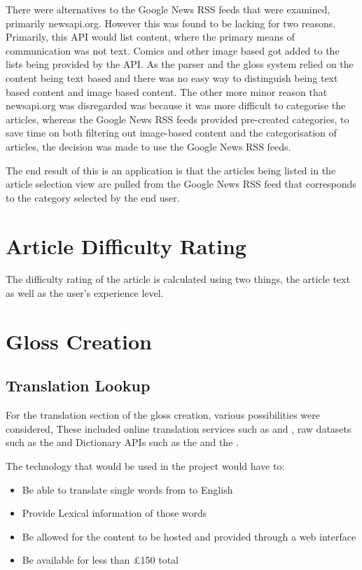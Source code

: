 There were alternatives to the Google News RSS feeds that were examined, primarily newsapi.org. However this was found to be lacking for two reasons. Primarily, this API would list content, where the primary means of communication was not text. Comics and other image based got added to the lists being provided by the API. As the parser and the gloss system relied on the content being text based and there was no easy way to distinguish being text based content and image based content. The other more minor reason that newsapi.org was disregarded was because it was more difficult to categorise the articles, whereas the Google News RSS feeds provided pre-created categories, to save time on both filtering out image-based content and the categorisation of articles, the decision was made to use the Google News RSS feeds. 

The end result of this is an application is that the articles being listed in the article selection view are pulled from the Google News RSS feed that corresponds to the category selected by the end user.

\section{Article Difficulty Rating}

The difficulty rating of the article is calculated using two things, the article text as well as the user's experience level. 


\section{Gloss Creation}

\subsection{Translation Lookup}

For the translation section of the gloss creation, various possibilities were considered, These included online translation services such as \textcite{googletranslate} and \textcite{bingtranslate}, raw datasets such as the \textcite{dictCC} and Dictionary APIs such as the \textcite{oxford} and the \textcite{collins}. 

The technology that would be used in the project would have to:
\begin{itemize}
	\item Be able to translate single words from to English
	\item Provide Lexical information of those words
	\item Be allowed for the content to be hosted and provided through a web interface
	\item Be available for less than \pounds150 total
	\end{itemize}
	
